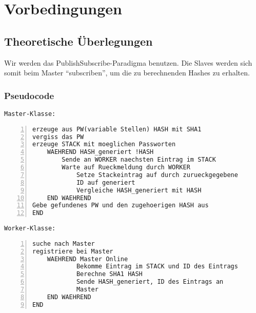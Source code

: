 \chapter{Vorbedingungen}

\section{Theoretische Überlegungen}
Wir werden das PublishSubscribe-Paradigma benutzen. Die Slaves werden sich somit beim Master \enquote{subscriben}, um die zu berechnenden Hashes zu erhalten.

\subsection{Pseudocode}
\texttt{Master-Klasse:}
\begin{lstlisting}[basicstyle=\ttfamily,numbers=left,numberstyle=\footnotesize\ttfamily,backgroundcolor=\color{sourcegray}]
erzeuge aus PW(variable Stellen) HASH mit SHA1
vergiss das PW
erzeuge STACK mit moeglichen Passworten
	WAEHREND HASH_generiert !HASH
		Sende an WORKER naechsten Eintrag im STACK
		Warte auf Rueckmeldung durch WORKER
    		Setze Stackeintrag auf durch zurueckgegebene
    		ID auf generiert 
    		Vergleiche HASH_generiert mit HASH
	END WAEHREND
Gebe gefundenes PW und den zugehoerigen HASH aus
END
\end{lstlisting}
\clearpage

\texttt{Worker-Klasse:}
\begin{lstlisting}[basicstyle=\ttfamily,numbers=left,numberstyle=\footnotesize\ttfamily,backgroundcolor=\color{sourcegray}]
suche nach Master
registriere bei Master
	WAEHREND Master Online
    		Bekomme Eintrag im STACK und ID des Eintrags
	    	Berechne SHA1 HASH
    		Sende HASH_generiert, ID des Eintrags an 
    		Master
	END WAEHREND
END
\end{lstlisting}